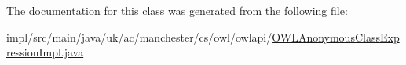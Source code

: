 The documentation for this class was generated from the following file\-:\begin{DoxyCompactItemize}
\item 
impl/src/main/java/uk/ac/manchester/cs/owl/owlapi/\hyperlink{_o_w_l_anonymous_class_expression_impl_8java}{O\-W\-L\-Anonymous\-Class\-Expression\-Impl.\-java}\end{DoxyCompactItemize}
